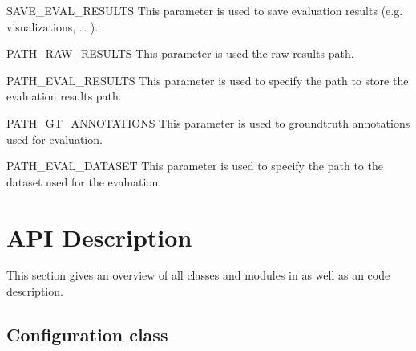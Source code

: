 \documentclass[letterpaper,10pt,english,openany,oneside]{sphinxmanual}
\begin{document}
SAVE\_EVAL\_RESULTS
This parameter is used to save evaluation results (e.g. visualizations, … ).



PATH\_RAW\_RESULTS
This parameter is used the raw results path.



PATH\_EVAL\_RESULTS
This parameter is used to specify the path to store the evaluation results path.



PATH\_GT\_ANNOTATIONS
This parameter is used to groundtruth annotations used for evaluation.



PATH\_EVAL\_DATASET
This parameter is used to specify the path to the dataset used for the evaluation.




\chapter{API Description}
\label{\detokenize{index:api-description}}
This section gives an overview of all classes and modules in  as well as an code description.


\section{Configuration class}
\label{\detokenize{Configuration:configuration-class}}\label{\detokenize{Configuration::doc}}
\end{document}
